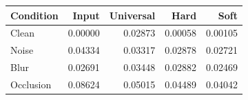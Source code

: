 \begin{tabular}{lrrrr}\toprule Condition & Input & Universal & Hard & Soft\\\midrule
Clean & 0.00000 & 0.02873 & 0.00058 & 0.00105\\
Noise & 0.04334 & 0.03317 & 0.02878 & 0.02721\\
Blur & 0.02691 & 0.03448 & 0.02882 & 0.02469\\
Occlusion & 0.08624 & 0.05015 & 0.04489 & 0.04042\\
\bottomrule\end{tabular}